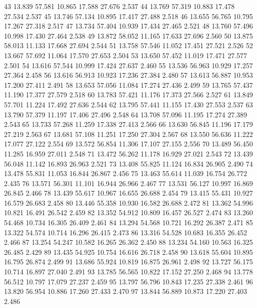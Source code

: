 \documentclass[a4paper,11pt]{scrartcl}
\begin{document}
\begin{Schunk}
\begin{Soutput}
43  13.839   57.581 10.865 17.588 27.676  2.537
44  13.769   57.319 10.883 17.478 27.534  2.537
45  13.746   57.134 10.895 17.417 27.488  2.518
46  13.655   56.765 10.795 17.267 27.318  2.517
47  13.734   57.404 10.939 17.434 27.465  2.521
48  13.760   57.496 10.998 17.430 27.464  2.538
49  13.872   58.052 11.165 17.633 27.696  2.560
50  13.875   58.013 11.133 17.668 27.694  2.544
51  13.758   57.546 11.052 17.451 27.521  2.526
52  13.667   57.692 11.064 17.570 27.653  2.504
53  13.650   57.452 11.019 17.471 27.577  2.501
54  13.616   57.544 10.999 17.424 27.637  2.460
55  13.536   56.963 10.929 17.257 27.364  2.458
56  13.616   56.913 10.923 17.236 27.384  2.480
57  13.613   56.887 10.953 17.200 27.411  2.491
58  13.653   57.056 11.084 17.274 27.436  2.499
59  13.765   57.437 11.190 17.377 27.579  2.518
60  13.783   57.421 11.176 17.373 27.566  2.527
61  13.849   57.701 11.224 17.492 27.636  2.544
62  13.795   57.441 11.155 17.430 27.553  2.537
63  13.790   57.379 11.197 17.406 27.496  2.548
64  13.708   57.096 11.195 17.274 27.389  2.543
65  13.733   57.268 11.259 17.338 27.413  2.566
66  13.630   56.845 11.196 17.179 27.219  2.563
67  13.681   57.108 11.251 17.250 27.304  2.567
68  13.550   56.636 11.222 17.077 27.122  2.554
69  13.572   56.854 11.306 17.107 27.155  2.556
70  13.489   56.450 11.285 16.959 27.011  2.548
71  13.472   56.262 11.178 16.929 27.021  2.543
72  13.439   56.048 11.142 16.893 26.963  2.521
73  13.408   55.825 11.124 16.834 26.905  2.490
74  13.478   55.831 11.053 16.844 26.867  2.456
75  13.463   55.614 11.039 16.754 26.772  2.435
76  13.571   56.301 11.101 16.944 26.966  2.467
77  13.531   56.127 10.997 16.869 26.845  2.466
78  13.439   55.617 10.967 16.655 26.688  2.454
79  13.415   55.431 10.927 16.579 26.683  2.458
80  13.446   55.358 10.930 16.582 26.688  2.472
81  13.362   54.996 10.821 16.491 26.542  2.459
82  13.352   54.912 10.809 16.457 26.527  2.474
83  13.260   54.468 10.734 16.305 26.409  2.461
84  13.294   54.568 10.721 16.292 26.387  2.471
85  13.322   54.574 10.714 16.296 26.415  2.473
86  13.316   54.528 10.683 16.355 26.452  2.466
87  13.254   54.247 10.582 16.265 26.362  2.450
88  13.234   54.160 10.563 16.325 26.485  2.429
89  13.435   54.925 10.754 16.616 26.718  2.458
90  13.618   55.604 10.895 16.795 26.874  2.499
91  13.686   55.924 10.819 16.875 26.961  2.498
92  13.727   56.175 10.714 16.897 27.040  2.491
93  13.785   56.565 10.822 17.152 27.250  2.468
94  13.778   56.512 10.797 17.079 27.237  2.459
95  13.797   56.796 10.843 17.235 27.338  2.461
96  13.820   56.954 10.886 17.260 27.433  2.470
97  13.844   56.889 10.873 17.220 27.403  2.486

\end{Soutput}
\end{Schunk}
\end{document}
